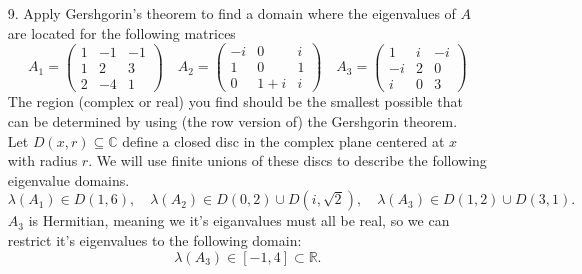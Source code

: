 \documentclass[11pt]{article}
\newcommand{\n}{\vspace{0.3cm}}
\newcommand{\C}{\mathbb{C}}
\newcommand{\R}{\mathbb{R}}
\begin{document}
\begin{enumerate}
	\item[9.] Apply Gershgorin’s theorem to find a domain where the eigenvalues of \(A\) are located for the following matrices
		\[
			A_1 = \left(\begin{array}{rrr} 1 & -1 & -1 \\ 1 & 2 & 3 \\ 2 & -4 & 1 \end{array}\right) \quad
			A_2 = \left(\begin{array}{rrr} -i & 0 & i \\ 1 & 0 & 1 \\ 0 & 1+i & i \end{array}\right) \quad
			A_3 = \left(\begin{array}{rrr} 1 & i & -i \\ -i & 2 & 0 \\ i & 0 & 3 \end{array}\right)
		\]
		The region (complex or real) you find should be the smallest possible that can be determined by using (the row version of) the Gershgorin theorem. \n\\
    Let \(D(x,r) \subseteq \C\) define a closed disc in the complex plane centered at \(x\) with radius \(r\).  We will use finite unions of these discs to describe the following eigenvalue domains.
    \[\lambda(A_1) \in D(1,6), \quad \lambda(A_2) \in D(0,2) \cup D(i,\sqrt2), \quad \lambda(A_3) \in D(1,2) \cup D(3,1).\]
    \(A_3\) is Hermitian, meaning we it's eiganvalues must all be real, so we can restrict it's eigenvalues to the following domain:
    \[\lambda(A_3) \in [-1,4] \subset \R.\]


\end{enumerate}
\end{document}
